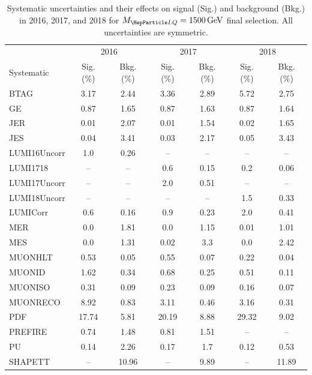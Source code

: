 \begin{table}[H]
	\begin{center}
        \begin{footnotesize}
			\caption{Systematic uncertainties and their effects on signal (Sig.) and background (Bkg.) in 2016, 2017, and 2018 for $\MLQ = \SI{1500}{GeV}$ final selection. All uncertainties are symmetric.}
			\begin{tabular}{lcccccc} \hline \hline
				& \multicolumn{2}{c}{2016} & \multicolumn{2}{c}{2017} & \multicolumn{2}{c}{2018} \\
				Systematic & Sig. (\%) & Bkg. (\%) & Sig. (\%) & Bkg. (\%) & Sig. (\%) & Bkg. (\%) \\ \hline
				BTAG &  3.17  &  2.44 &  3.36  &  2.89 &  5.72  &  2.75 \\
				GE &  0.87  &  1.65 &  0.87  &  1.63 &  0.87  &  1.64 \\
				JER &  0.01  &  2.07 &  0.01  &  1.54 &  0.02  &  1.65 \\
				JES &  0.04  &  3.41 &  0.03  &  2.17 &  0.05  &  3.43 \\
				LUMI16Uncorr &  1.0  &  0.26 & -- & -- & -- & -- \\
				LUMI1718 & -- & -- &  0.6  &  0.15 &  0.2  &  0.06 \\
				LUMI17Uncorr & -- & -- &  2.0  &  0.51 & -- & -- \\
				LUMI18Uncorr & -- & -- & -- & -- &  1.5  &  0.33 \\
				LUMICorr &  0.6  &  0.16 &  0.9  &  0.23 &  2.0  &  0.41 \\
				MER &  0.0  &  1.81 &  0.0  &  1.15 &  0.01  &  1.01 \\
				MES &  0.0  &  1.31 &  0.02  &  3.3 &  0.0  &  2.42 \\
				MUONHLT &  0.53  &  0.05 &  0.55  &  0.07 &  0.22  &  0.04 \\
				MUONID &  1.62  &  0.34 &  0.68  &  0.25 &  0.51  &  0.11 \\
				MUONISO &  0.31  &  0.09 &  0.23  &  0.09 &  0.16  &  0.07 \\
				MUONRECO &  8.92  &  0.83 &  3.11  &  0.46 &  3.16  &  0.31 \\
				PDF &  17.74  &  5.81 &  20.19  &  8.88 &  29.32  &  9.02 \\
				PREFIRE &  0.74  &  1.48 &  0.81  &  1.51 & -- & -- \\
				PU &  0.14  &  2.26 &  0.17  &  1.7 &  0.12  &  0.53 \\
				SHAPETT & -- &  10.96 & -- &  9.89 & -- &  11.89 \\

\end{tabular}
\end{footnotesize}
\end{center}
\end{table}
